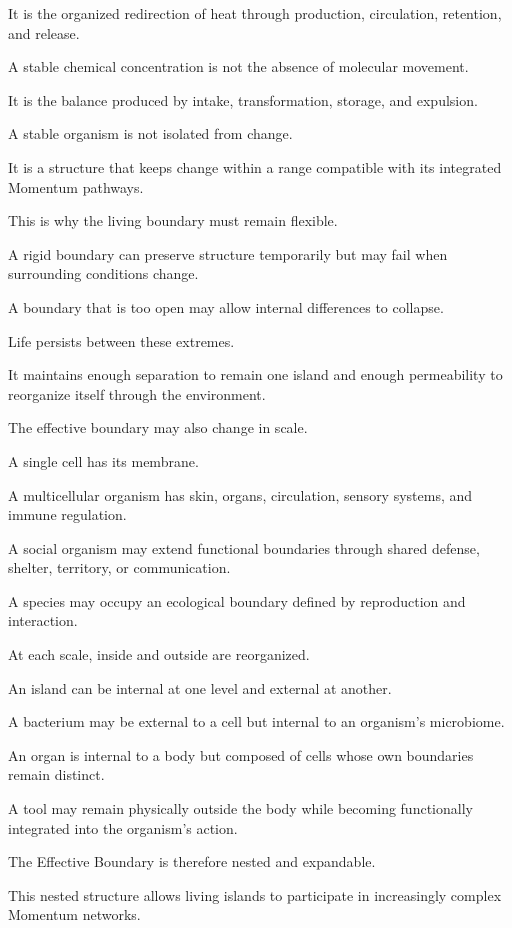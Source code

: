 It is the organized redirection of heat through production, circulation, retention, and release.

A stable chemical concentration is not the absence of molecular movement.

It is the balance produced by intake, transformation, storage, and expulsion.

A stable organism is not isolated from change.

It is a structure that keeps change within a range compatible with its integrated Momentum pathways.

This is why the living boundary must remain flexible.

A rigid boundary can preserve structure temporarily but may fail when surrounding conditions change.

A boundary that is too open may allow internal differences to collapse.

Life persists between these extremes.

It maintains enough separation to remain one island and enough permeability to reorganize itself through the environment.

The effective boundary may also change in scale.

A single cell has its membrane.

A multicellular organism has skin, organs, circulation, sensory systems, and immune regulation.

A social organism may extend functional boundaries through shared defense, shelter, territory, or communication.

A species may occupy an ecological boundary defined by reproduction and interaction.

At each scale, inside and outside are reorganized.

An island can be internal at one level and external at another.

A bacterium may be external to a cell but internal to an organism’s microbiome.

An organ is internal to a body but composed of cells whose own boundaries remain distinct.

A tool may remain physically outside the body while becoming functionally integrated into the organism’s action.

The Effective Boundary is therefore nested and expandable.

This nested structure allows living islands to participate in increasingly complex Momentum networks.


